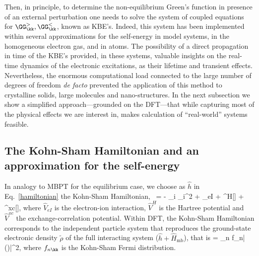 Then, in principle, to determine the non-equilibrium Green's function in presence of an external perturbation one needs  to solve the system of coupled equations for $\GG_{\kk}^>,\GG_{\kk}^<$, known as KBE's. Indeed, this system has been implemented within several approximations for the self-energy in model
systems,\cite{Kohler1999123,PhysRevLett.103.176404} in the homogeneous electron gas,\cite{PhysRevLett.84.1768} and in atoms.\cite{PhysRevLett.98.153004}
The possibility of a direct propagation in time of the KBE's provided, in these systems, valuable insights on the real-time dynamics of the electronic excitations, as their lifetime and transient effects.\cite{Kohler1999123,PhysRevLett.103.176404,PhysRevLett.84.1768,PhysRevLett.98.153004} 
Nevertheless, the enormous computational load connected to the large number of degrees of freedom {\it de facto} prevented the application of this method to crystalline solids, large molecules and nano-structures. In the next subsection we show a simplified approach---grounded on the DFT---that while capturing most of the physical effects we are interest in, makes calculation of ``real-world'' systems feasible. 

\subsection{The Kohn-Sham Hamiltonian and an approximation for the self-energy}
\label{ss:KS-CHSX}

In analogy to MBPT for the equilibrium case,
we choose as $\hat{h}$ in Eq.~\eqref{hamiltonian} the Kohn-Sham Hamiltonian,~\cite{PhysRev.140.A1133} 
\be
{} = - \sum_i \nabla_i^2 + 
_{eI} + ^H[\tilde \rho]   + ^{xc}[\tilde \rho], \label{eq:kshamH}
\ee
where $\hat{V}_{eI}$ is the electron-ion interaction, 
$\hat{V}^H$ is the Hartree potential and
$\hat{V}^{xc}$ the exchange-correlation potential.
Within DFT, the Kohn-Sham Hamiltonian corresponds to the independent particle system
that reproduces the ground-state electronic density $\tilde \rho$ of
the full interacting system ($\hat h + \hat H_{\text{mb}}$), that is
\be
\tilde \rho = \sum_{n\kk} f_{n\kk}|\varphi(\rr)|^2,
\label{eq:KSden}
\ee
where $f_{n\kk}$ is the Kohn-Sham Fermi distribution. 

